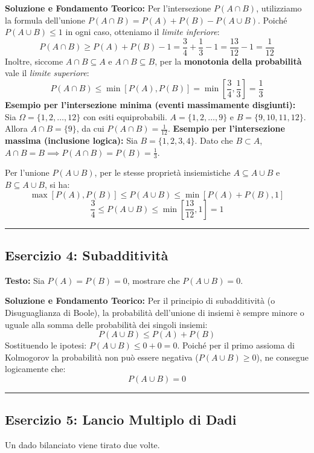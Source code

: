 \documentclass[12pt, a4paper]{article}
\begin{document}
\textbf{Soluzione e Fondamento Teorico:} 
Per l'intersezione $P(A \cap B)$, utilizziamo la formula dell'unione $P(A \cap B) = P(A) + P(B) - P(A \cup B)$. Poiché $P(A \cup B) \le 1$ in ogni caso, otteniamo il \textit{limite inferiore}:
$$ P(A \cap B) \ge P(A) + P(B) - 1 = \frac{3}{4} + \frac{1}{3} - 1 = \frac{13}{12} - 1 = \frac{1}{12} $$
Inoltre, siccome $A \cap B \subseteq A$ e $A \cap B \subseteq B$, per la \textbf{monotonia della probabilità} vale il \textit{limite superiore}:
$$ P(A \cap B) \le \min[P(A), P(B)] = \min\left[\frac{3}{4}, \frac{1}{3}\right] = \frac{1}{3} $$
\textbf{Esempio per l'intersezione minima (eventi massimamente disgiunti):} 
Sia $\Omega = \{1, 2, \dots, 12\}$ con esiti equiprobabili. 
$A = \{1, 2, \dots, 9\}$ e $B = \{9, 10, 11, 12\}$. Allora $A \cap B = \{9\}$, da cui $P(A \cap B) = \frac{1}{12}$.
\textbf{Esempio per l'intersezione massima (inclusione logica):} 
Sia $B = \{1, 2, 3, 4\}$. Dato che $B \subset A$, $A \cap B = B \implies P(A \cap B) = P(B) = \frac{1}{3}$.

Per l'unione $P(A \cup B)$, per le stesse proprietà insiemistiche $A \subseteq A \cup B$ e $B \subseteq A \cup B$, si ha:
$$ \max[P(A), P(B)] \le P(A \cup B) \le \min[P(A) + P(B), 1] $$
$$ \frac{3}{4} \le P(A \cup B) \le \min\left[\frac{13}{12}, 1\right] = 1 $$

\vspace{0.5cm}\hrule\vspace{0.5cm}

\subsection*{Esercizio 4: Subadditività}
\textbf{Testo:} Sia $P(A)=P(B)=0$, mostrare che $P(A \cup B)=0$.

\textbf{Soluzione e Fondamento Teorico:} 
Per il principio di subadditività (o Disuguaglianza di Boole), la probabilità dell'unione di insiemi è sempre minore o uguale alla somma delle probabilità dei singoli insiemi:
$$ P(A \cup B) \le P(A) + P(B) $$
Sostituendo le ipotesi: $P(A \cup B) \le 0 + 0 = 0$.
Poiché per il primo assioma di Kolmogorov la probabilità non può essere negativa ($P(A \cup B) \ge 0$), ne consegue logicamente che:
$$ P(A \cup B) = 0 $$

\vspace{0.5cm}\hrule\vspace{0.5cm}

\subsection*{Esercizio 5: Lancio Multiplo di Dadi}
Un dado bilanciato viene tirato due volte.
\end{document}

